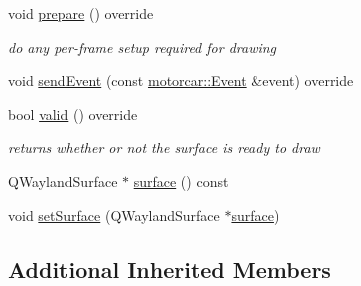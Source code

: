 \begin{DoxyCompactItemize}
void \hyperlink{classqtmotorcar_1_1QtWaylandMotorcarSurface_ae898706dcf80a2f00ed2477c570dcebe}{prepare} () override
\begin{DoxyCompactList}\small\item\em do any per-\/frame setup required for drawing \end{DoxyCompactList}\item 
void \hyperlink{classqtmotorcar_1_1QtWaylandMotorcarSurface_a7deebcf58954f82c8d5741af054414a7}{send\-Event} (const \hyperlink{classmotorcar_1_1Event}{motorcar\-::\-Event} \&event) override
\item 
bool \hyperlink{classqtmotorcar_1_1QtWaylandMotorcarSurface_a3bea85a2a6a3079e60c3b37dd08aebc6}{valid} () override
\begin{DoxyCompactList}\small\item\em returns whether or not the surface is ready to draw \end{DoxyCompactList}\item 
Q\-Wayland\-Surface $\ast$ \hyperlink{classqtmotorcar_1_1QtWaylandMotorcarSurface_aeac2b36246941755d0bedaf1c9fe773b}{surface} () const 
\item 
void \hyperlink{classqtmotorcar_1_1QtWaylandMotorcarSurface_aa7921de176d4d39fe076f145dd382e75}{set\-Surface} (Q\-Wayland\-Surface $\ast$\hyperlink{simple-egl_8c_a0720952aa1caded45b5bcdce589663a9}{surface})
\end{DoxyCompactItemize}
\subsection*{Additional Inherited Members}


